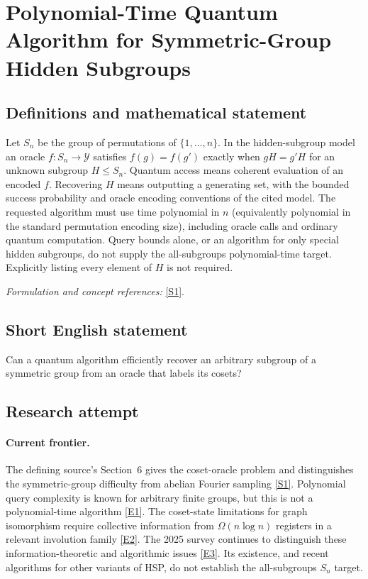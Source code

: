 \documentclass[11pt,a4paper]{article}
\newcommand{\sref}[2]{\hyperlink{source:#1:#2}{[S#2]}}
\newcommand{\eref}[2]{\hyperlink{extra:#1:#2}{[E#2]}}
\newif\ifshowcatalogue
\newcommand{\cataloguescope}[1]{\ifshowcatalogue
 \paragraph{Exact scope in the supplied catalogue.}
 \begin{quote}\small #1\end{quote}\fi}
\numberwithin{equation}{section}
\begin{document}
\setcounter{section}{0}
\clearpage
\section*{\texorpdfstring{Polynomial-Time Quantum Algorithm for Symmetric-Group Hidden Subgroups}{Polynomial-Time Quantum Algorithm for Symmetric-Group Hidden Subgroups}}\label{30006778}
\subsection{Definitions and mathematical statement}
Let $S_n$ be the group of permutations of $\{1,\ldots,n\}$. In the hidden-subgroup model an oracle $f:S_n\to\mathcal Y$ satisfies
$f(g)=f(g')$ exactly when $gH=g'H$ for an unknown subgroup $H\le S_n$. Quantum access means coherent evaluation of an encoded $f$. Recovering $H$ means outputting a generating set, with the bounded success probability and oracle encoding conventions of the cited model. The requested algorithm must use time polynomial in $n$ (equivalently polynomial in the standard permutation encoding size), including oracle calls and ordinary quantum computation. Query bounds alone, or an algorithm for only special hidden subgroups, do not supply the all-subgroups polynomial-time target. Explicitly listing every element of $H$ is not required.
\par\smallskip\textit{Formulation and concept references:} \sref{30006778}{1}.
\cataloguescope{Give a polynomial-time quantum algorithm that recovers a subgroup hidden by an oracle over the symmetric group S\_n.}
\subsection{Short English statement}
Can a quantum algorithm efficiently recover an arbitrary subgroup of a symmetric group from an oracle that labels its cosets?
\subsection{Research attempt}

\paragraph{Current frontier.}
The defining source's Section~6 gives the coset-oracle problem and distinguishes the symmetric-group difficulty from abelian Fourier sampling \sref{30006778}{1}. Polynomial query complexity is known for arbitrary finite groups, but this is not a polynomial-time algorithm \eref{30006778}{1}. The coset-state limitations for graph isomorphism require collective information from $\Omega(n\log n)$ registers in a relevant involution family \eref{30006778}{2}. The 2025 survey continues to distinguish these information-theoretic and algorithmic issues \eref{30006778}{3}. Its existence, and recent algorithms for other variants of HSP, do not establish the all-subgroups $S_n$ target.
\end{document}
